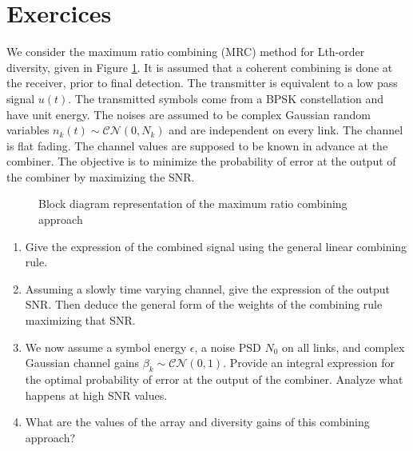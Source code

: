 \documentclass [a4paper, 11pt] {article}
\begin{document}
    \part*{Exercices}
    
    \begin{exercise}{1}
        We consider the maximum ratio combining (MRC) method for Lth-order diversity, given in Figure \ref{fig:combining}. It is assumed that a coherent combining is done at the receiver, prior to final detection. The transmitter is equivalent to a low pass signal $u(t)$. The transmitted symbols come from a BPSK constellation and have unit energy. The noises are assumed to be complex Gaussian random variables $n_k(t) \sim \mathcal{C}\mathcal{N}(0,N_k)$ and are independent on every link. The channel is flat fading. The channel values are supposed to be known in advance at the combiner. The objective is to minimize the probability of error at the output of the combiner by maximizing the SNR.
            
            \begin{figure}[H]
            \centering
            
            \caption{Block diagram representation of the maximum ratio combining approach}
            \label{fig:combining}
            \end{figure}
            
        \begin{enumerate}
        \item Give the expression of the combined signal using the general linear combining rule.
        \item Assuming a slowly time varying channel, give the expression of the output SNR. Then deduce the general form of the weights of the combining rule maximizing that SNR.
        \item We now assume a symbol energy $\epsilon$, a noise PSD $N_0$ on all links, and complex Gaussian channel gains $\beta_k \sim \mathcal{C}\mathcal{N}(0,1)$. Provide an integral expression for the optimal probability of error at the output of the combiner. Analyze what happens at high SNR values.
        \item What are the values of the array and diversity gains of this combining approach?
        \end{enumerate}
    \end{exercise}
    
\end{document}

